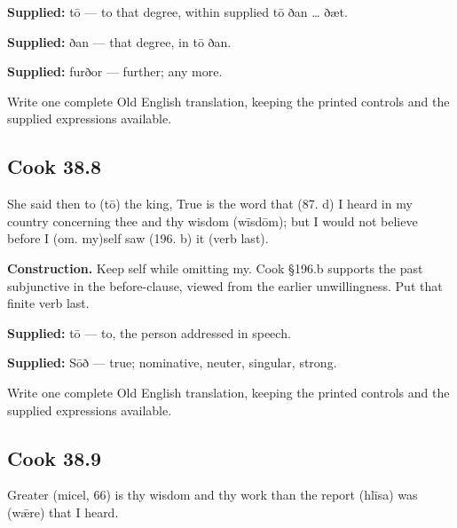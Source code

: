 \textbf{Supplied:} tō — to that degree, within supplied tō ðan … ðæt.

\textbf{Supplied:} ðan — that degree, in tō ðan.

\textbf{Supplied:} furðor — further; any more.

Write one complete Old English translation, keeping the printed controls and the supplied expressions available.

\par\begin{minipage}{\linewidth}\raggedright
\subsection*{Cook 38.8}

She said then to (tō) the king, True is the word that (87. d) I heard in my country concerning thee and thy wisdom (wīsdōm); but I would not believe before I (om. my)self saw (196. b) it (verb last).

\textbf{Construction.} Keep self while omitting my. Cook §196.b supports the past subjunctive in the before-clause, viewed from the earlier unwillingness. Put that finite verb last.

\textbf{Supplied:} tō — to, the person addressed in speech.

\end{minipage}\par\addvspace{4pt}

\textbf{Supplied:} Sōð — true; nominative, neuter, singular, strong.

Write one complete Old English translation, keeping the printed controls and the supplied expressions available.

\par\begin{minipage}{\linewidth}\raggedright
\subsection*{Cook 38.9}

Greater (micel, 66) is thy wisdom and thy work than the report (hlīsa) was (wǣre) that I heard.

\end{minipage}\par\addvspace{4pt}

